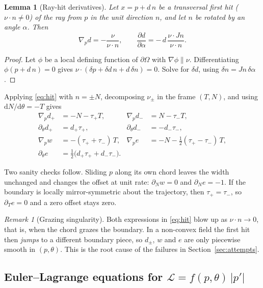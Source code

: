 \documentclass[11pt,a4paper]{article}
\numberwithin{equation}{section}
\theoremstyle{plain}
\newtheorem{lemma}[proposition]{Lemma}
\theoremstyle{definition}
\theoremstyle{remark}
\newtheorem{remark}[proposition]{Remark}
\newcommand{\dd}{\mathrm{d}}
\newcommand{\pO}{\partial\Omega}
\begin{document}
\begin{lemma}[Ray-hit derivatives]\label{lem:hit}
Let $x = p + d\,n$ be a transversal first hit ($\nu\cdot n\neq0$) of the ray from $p$ in the unit direction $n$, and let $n$ be rotated by an angle $\alpha$. Then
\begin{equation}
\nabla_p d = -\frac{\nu}{\nu\cdot n},
\qquad
\frac{\partial d}{\partial\alpha} = -\,d\,\frac{\nu\cdot Jn}{\nu\cdot n}.
\label{eq:hit}
\end{equation}
\end{lemma}
\begin{proof}
Let $\phi$ be a local defining function of $\pO$ with $\nabla\phi\parallel\nu$. Differentiating $\phi(p+d\,n)=0$ gives $\nu\cdot(\delta p+\delta d\,n+d\,\delta n)=0$. Solve for $\delta d$, using $\delta n = Jn\,\delta\alpha$.
\end{proof}

Applying \eqref{eq:hit} with $n=\pm N$, decomposing $\nu_\pm$ in the frame $(T,N)$, and using $\dd N/\dd\theta=-T$ gives
\begin{align}
\nabla_p d_+ &= -N-\tau_+T, & \nabla_p d_- &= N-\tau_-T, \nonumber\\
\partial_\theta d_+ &= d_+\tau_+, & \partial_\theta d_- &= -d_-\tau_-, \label{eq:dpm}\\[2pt]
\nabla_p w &= -(\tau_++\tau_-)\,T, & \nabla_p e &= -N-\tfrac12(\tau_+-\tau_-)\,T, \nonumber\\
\partial_\theta e &= \tfrac12\bigl(d_+\tau_+ + d_-\tau_-\bigr). \label{eq:we}
\end{align}

Two sanity checks follow. Sliding $p$ along its own chord leaves the width unchanged and changes the offset at unit rate: $\partial_N w=0$ and $\partial_N e=-1$. If the boundary is locally mirror-symmetric about the trajectory, then $\tau_+=\tau_-$, so $\partial_T e=0$ and a zero offset stays zero.

\begin{remark}[Grazing singularity]\label{rem:grazing}
Both expressions in \eqref{eq:hit} blow up as $\nu\cdot n\to0$, that is, when the chord grazes the boundary. In a non-convex field the first hit then \emph{jumps} to a different boundary piece, so $d_\pm$, $w$ and $e$ are only piecewise smooth in $(p,\theta)$. This is the root cause of the failures in Section~\ref{sec:attempts}.
\end{remark}

\subsection{Euler--Lagrange equations for $\mathcal L = f(p,\theta)\,|p'|$}
\end{document}
